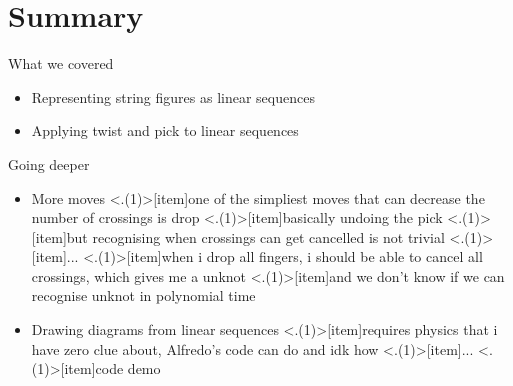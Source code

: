 \section*{Summary}

\begin{frame}{\secname}
What we covered
\begin{itemize}[<+(1)->]
    \item Representing string figures as linear sequences
    \item Applying twist and pick to linear sequences
\end{itemize}

\pause Going deeper

\begin{itemize}[<+(1)->]
    \item More moves 
    \note<.(1)>[item]{one of the simpliest moves that can decrease the number of crossings is drop}
    \note<.(1)>[item]{basically undoing the pick}
    \note<.(1)>[item]{but recognising when crossings can get cancelled is not trivial}
    \note<.(1)>[item]{...}
    \note<.(1)>[item]{when i drop all fingers, i should be able to cancel all crossings, which gives me a unknot}
    \note<.(1)>[item]{and we don't know if we can recognise unknot in polynomial time}
    \item Drawing diagrams from linear sequences
    \note<.(1)>[item]{requires physics that i have zero clue about, Alfredo's code can do and idk how}
    \note<.(1)>[item]{...}
    \note<.(1)>[item]{code demo}
\end{itemize}
\end{frame}